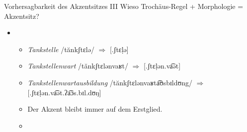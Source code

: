 \begin{frame}
  {Vorhersagbarkeit des Akzentsitzes III}
  \onslide<+->
  \onslide<+->
  Wieso Trochäus-Regel + Morphologie = Akzentsitz?\\
  \onslide<+->
  \Halbzeile
  \begin{itemize}[<+->]
    \item {}
    \begin{itemize}[<+->]
      \item \textit{Tankstelle} /tănkʃtɛlə/ \ensuremath{\Rightarrow} [.ʃtɛḷə]
      \item \textit{Tankstellenwart} /tănkʃtɛlənvaʁt/ \ensuremath{\Rightarrow} [.ʃtɛḷən.va͡ət]
      \item \textit{Tankstellenwartausbildung} /tănkʃtɛlənvaʁta͡ʊsbɪldʊng/ \ensuremath{\Rightarrow} [.ʃtɛḷən.va͡ət.ʔa͡ɔs.bɪl.dʊŋ]
        \Halbzeile
      \item Der Akzent bleibt immer auf dem Erstglied.
      \item {}
    \end{itemize}
  \end{itemize}
\end{frame}

